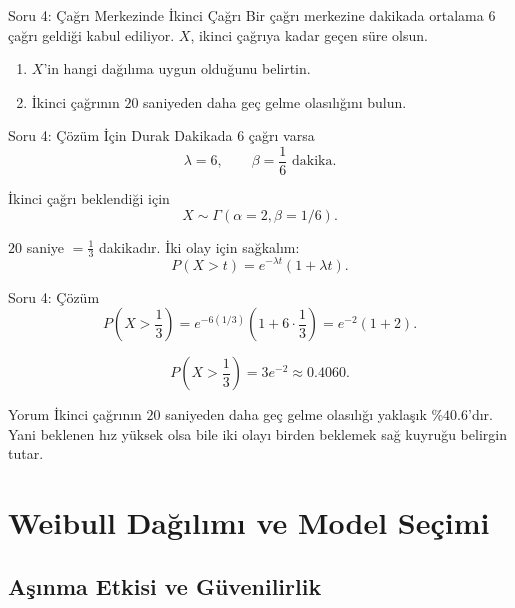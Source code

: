\documentclass[light]{lutbeamer}
\begin{document}
\begin{frame}{Soru 4: Çağrı Merkezinde İkinci Çağrı}
    \small
    Bir çağrı merkezine dakikada ortalama \(6\) çağrı geldiği kabul ediliyor. \(X\), ikinci çağrıya kadar geçen süre olsun.

    \begin{enumerate}
        \item[(a)] \(X\)'in hangi dağılıma uygun olduğunu belirtin.
        \item[(b)] İkinci çağrının \(20\) saniyeden daha geç gelme olasılığını bulun.
    \end{enumerate}
\end{frame}

\begin{frame}{Soru 4: Çözüm İçin Durak}
    \color{red!70!black}
    \small
    Dakikada \(6\) çağrı varsa
    \[
    \lambda=6, \qquad \beta=\frac{1}{6} \text{ dakika}.
    \]

    İkinci çağrı beklendiği için
    \[
    X \sim \Gamma(\alpha=2,\beta=1/6).
    \]

    \(20\) saniye \(=\frac{1}{3}\) dakikadır. İki olay için sağkalım:
    \[
    P(X>t)=e^{-\lambda t}(1+\lambda t).
    \]
\end{frame}

\begin{frame}{Soru 4: Çözüm}
    \small
    \[
    P\left(X>\frac{1}{3}\right)=e^{-6(1/3)}\left(1+6\cdot \frac{1}{3}\right)
    =e^{-2}(1+2).
    \]

    \[
    P\left(X>\frac{1}{3}\right)=3e^{-2}\approx 0.4060.
    \]

    \begin{exampleblock}{Yorum}
        İkinci çağrının \(20\) saniyeden daha geç gelme olasılığı yaklaşık \(\%40.6\)'dır.
        Yani beklenen hız yüksek olsa bile iki olayı birden beklemek sağ kuyruğu belirgin tutar.
    \end{exampleblock}
\end{frame}

\section{Weibull Dağılımı ve Model Seçimi}
\subsection{Aşınma Etkisi ve Güvenilirlik}
\end{document}
